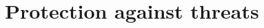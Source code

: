 \documentclass[Main]{subfiles}
\begin{document}
\section{Protection against threats}
\end{document}
